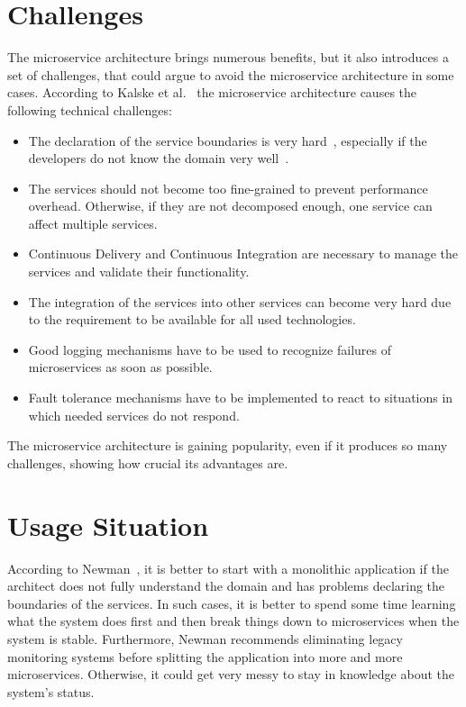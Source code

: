 \section{Challenges} \label{sec:microservice_challenges}
The microservice architecture brings numerous benefits, but it also introduces a set of challenges, that could argue to avoid the microservice architecture in some cases.
According to Kalske et al.~\cite{kalske2017challenges} the microservice architecture causes the following technical challenges: 
\begin{itemize}
    \item The declaration of the service boundaries is very hard~\cite{kalske2017challenges}, especially if the developers do not know the domain very well~\cite{newman2021building}.
    \item The services should not become too fine-grained to prevent performance overhead.
		Otherwise, if they are not decomposed enough, one service can affect multiple services.
    \item Continuous Delivery and Continuous Integration are necessary to manage the services and validate their functionality.
    \item The integration of the services into other services can become very hard due to the requirement to be available for all used technologies.
    \item Good logging mechanisms have to be used to recognize failures of microservices as soon as possible.
    \item Fault tolerance mechanisms have to be implemented to react to situations in which needed services do not respond.
\end{itemize}
The microservice architecture is gaining popularity, even if it produces so many challenges, showing how crucial its advantages are.

\section{Usage Situation}
According to Newman~\cite{newman2021building}, it is better to start with a monolithic application if the architect does not fully understand the domain and has problems declaring the boundaries of the services.
In such cases, it is better to spend some time learning what the system does first and then break things down to microservices when the system is stable.
Furthermore, Newman recommends eliminating legacy monitoring systems before splitting the application into more and more microservices.
Otherwise, it could get very messy to stay in knowledge about the system's status.


